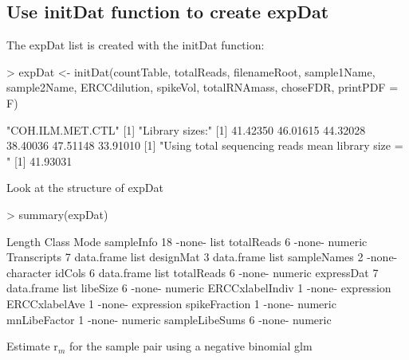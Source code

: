 \documentclass{article}
\begin{document}
\subsection{Use initDat function to create expDat}
The expDat list is created with the initDat function:
\begin{Schunk}
\begin{Sinput}
> expDat <- initDat(countTable, totalReads, filenameRoot, sample1Name,
                    sample2Name, ERCCdilution, spikeVol, totalRNAmass, choseFDR,
                    printPDF = F)
\end{Sinput}
\begin{Soutput}
[1] "COH.ILM.MET.CTL"
[1] "Library sizes:"
[1] 41.42350 46.01615 44.32028 38.40036 47.51148 33.91010
[1] "Using total sequencing reads mean library size = "
[1] 41.93031
\end{Soutput}
\end{Schunk}
Look at the structure of expDat
\begin{Schunk}
\begin{Sinput}
> summary(expDat)
\end{Sinput}
\begin{Soutput}
                Length Class      Mode      
sampleInfo      18     -none-     list      
totalReads       6     -none-     numeric   
Transcripts      7     data.frame list      
designMat        3     data.frame list      
sampleNames      2     -none-     character 
idCols           6     data.frame list      
totalReads       6     -none-     numeric   
expressDat       7     data.frame list      
libeSize         6     -none-     numeric   
ERCCxlabelIndiv  1     -none-     expression
ERCCxlabelAve    1     -none-     expression
spikeFraction    1     -none-     numeric   
mnLibeFactor     1     -none-     numeric   
sampleLibeSums   6     -none-     numeric   
\end{Soutput}
\end{Schunk}
Estimate r$_m$ for the sample pair using a negative binomial glm
\end{document}
